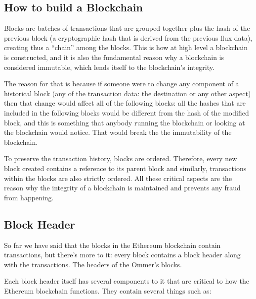 \subsection{How to build a Blockchain}\label{how-to-build-a-blockchain}

Blocks are batches of transactions that are grouped together plus the
hash of the previous block (a cryptographic hash that is derived from
the previous flux data), creating thus a ``chain'' among the blocks.
This is how at high level a blockchain is constructed, and it is also
the fundamental reason why a blockchain is considered immutable, which
lends itself to the blockchain's integrity.

The reason for that is because if someone were to change any component
of a historical block (any of the transaction data: the destination or
any other aspect) then that change would affect all of the following
blocks: all the hashes that are included in the following blocks would
be different from the hash of the modified block, and this is something
that anybody running the blockchain or looking at the blockchain would
notice. That would break the the immutability of the blockchain.

To preserve the transaction history, blocks are ordered. Therefore,
every new block created contains a reference to its parent block and
similarly, transactions within the blocks are also strictly ordered. All
these critical aspects are the reason why the integrity of a blockchain
is maintained and prevents any fraud from happening.

\subsection{Block Header}\label{block-header}

So far we have said that the blocks in the Ethereum blockchain contain
transactions, but there's more to it: every block contains a block
header along with the transactions. The headers of the Ommer's blocks.

Each block header itself has several components to it that are critical
to how the Ethereum blockchain functions. They contain several things
such as:

